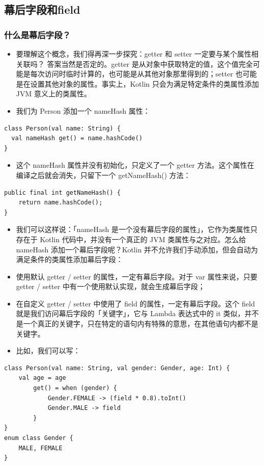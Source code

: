 \documentclass[9pt, b5paper]{article}
\begin{document}
\subsection{幕后字段和field}
\label{sec-7-5}
\subsubsection{什么是幕后字段？}
\label{sec-7-5-1}
\begin{itemize}
\item 要理解这个概念，我们得再深一步探究：getter 和 setter 一定要与某个属性相关联吗？ 答案当然是否定的。getter 是从对象中获取特定的值，这个值完全可能是每次访问时临时计算的，也可能是从其他对象那里得到的；setter 也可能是在设置其他对象的属性。事实上，Kotlin 只会为满足特定条件的类属性添加 JVM 意义上的类属性。
\item 我们为 Person 添加一个 nameHash 属性：
\end{itemize}
\begin{verbatim}
class Person(val name: String) {
  val nameHash get() = name.hashCode()
}
\end{verbatim}
\begin{itemize}
\item 这个 nameHash 属性并没有初始化，只定义了一个 getter 方法。这个属性在编译之后就会消失，只留下一个 getNameHash() 方法：
\end{itemize}
\begin{verbatim}
public final int getNameHash() {
    return name.hashCode();
}
\end{verbatim}
\begin{itemize}
\item 我们可以这样说：「nameHash 是一个没有幕后字段的属性」，它作为类属性只存在于 Kotlin 代码中，并没有一个真正的 JVM 类属性与之对应。怎么给 nameHash 添加一个幕后字段呢？Kotlin 并不允许我们手动添加，但会自动为满足条件的类属性添加幕后字段：
\item 使用默认 getter / setter 的属性，一定有幕后字段。对于 var 属性来说，只要 getter / setter 中有一个使用默认实现，就会生成幕后字段；
\item 在自定义 getter / setter 中使用了 field 的属性，一定有幕后字段。这个 field 就是我们访问幕后字段的「关键字」，它与 Lambda 表达式中的 it 类似，并不是一个真正的关键字，只在特定的语句内有特殊的意思，在其他语句内都不是关键字。
\item 比如，我们可以写：
\end{itemize}
\begin{verbatim}
class Person(val name: String, val gender: Gender, age: Int) {
    val age = age
        get() = when (gender) {
            Gender.FEMALE -> (field * 0.8).toInt()
            Gender.MALE -> field
        }
}
enum class Gender {
    MALE, FEMALE
}
\end{verbatim}
\end{document}
